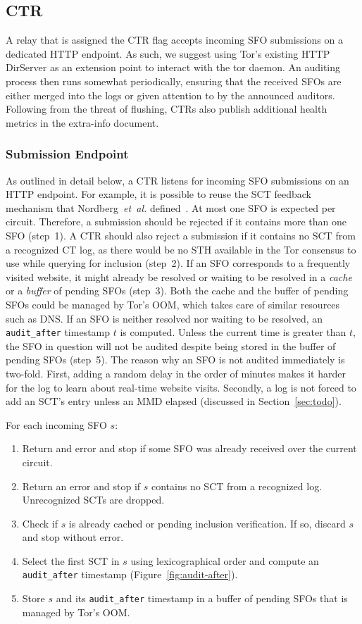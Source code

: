 \subsection{CTR}
A relay that is assigned the CTR flag accepts incoming SFO submissions on a
dedicated HTTP endpoint.  As such, we suggest using Tor's existing HTTP
DirServer as an extension point to interact with the tor daemon.  An auditing
process then runs somewhat periodically, ensuring that the received SFOs are
either merged into the logs or given attention to by the announced auditors.
Following from the threat of flushing, CTRs also publish additional health
metrics in the extra-info document.

\subsubsection{Submission Endpoint}
As outlined in detail below, a CTR listens for incoming SFO submissions on an
HTTP endpoint.  For example, it is possible to reuse the SCT feedback mechanism
that Nordberg~\emph{et~al.} defined~\cite{nordberg}.  At most one SFO is
expected per circuit.  Therefore, a submission should be rejected if it
contains more than one SFO (step~1).  A CTR should also reject a submission if
it contains no SCT from a recognized CT log, as there would be no STH available
in the Tor consensus to use while querying for inclusion (step~2).
If an SFO corresponds to a frequently visited website, it might already be
resolved or waiting to be resolved in a \emph{cache} or a \emph{buffer} of
pending SFOs (step~3).  Both the cache and the buffer of pending SFOs could be
managed by Tor's OOM, which takes care of similar resources such as DNS.  If an
SFO is neither resolved nor waiting to be resolved, an \texttt{audit\_after}
timestamp $t$ is computed.  Unless the current time is greater than $t$, the SFO
in question will not be audited despite being stored in the buffer of pending
SFOs (step~5).  The reason why an SFO is not audited immediately is two-fold.
First, adding a random delay in the order of minutes makes it harder for the log
to learn about real-time website visits.  Secondly, a log is not forced to add
an SCT's entry unless an MMD elapsed (discussed in Section~\ref{sec:todo}).

For each incoming SFO $s$:
\begin{enumerate}
	\item Return and error and stop if some SFO was already received over the
		current circuit.
	\item Return an error and stop if $s$ contains no SCT from a recognized log.
		Unrecognized SCTs are dropped. %
	\item Check if $s$ is already cached or pending inclusion verification.
		If so, discard $s$ and stop without error.
	\item Select the first SCT in $s$ using lexicographical order and compute
		an \texttt{audit\_after} timestamp (Figure~\ref{fig:audit-after}).
	\item Store $s$ and its \texttt{audit\_after} timestamp in a buffer of
		pending SFOs that is managed by Tor's OOM.
\end{enumerate}

